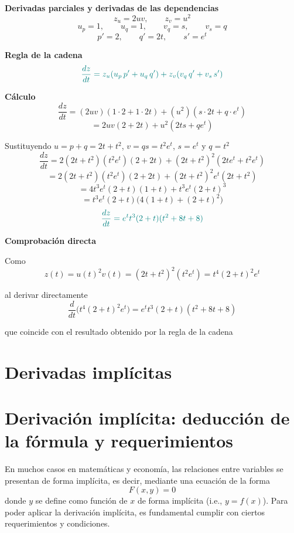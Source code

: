 \documentclass{article}
\begin{document}
\textbf{Derivadas parciales y derivadas de las dependencias}
\[
z_u=2uv,\qquad z_v=u^{2}
\]
\[
u_p=1,\qquad u_q=1,\qquad v_q=s,\qquad v_s=q
\]
\[
p'=2,\qquad q'=2t,\qquad s'=e^{t}
\]

\textbf{Regla de la cadena}
\[
\color{teal}
\frac{dz}{dt}
=
z_u\!\left(u_p\,p'+u_q\,q'\right)
+
z_v\!\left(v_q\,q'+v_s\,s'\right)
\]

\textbf{Cálculo}
\[
\frac{dz}{dt}
=
(2uv)(1\cdot 2+1\cdot 2t)
+
(u^{2})(s\cdot 2t+q\cdot e^{t})
\]
\[
=
2uv(2+2t)+u^{2}(2ts+qe^{t})
\]

Sustituyendo \(u=p+q=2t+t^{2}\), \(v=qs=t^{2}e^{t}\), \(s=e^{t}\) y \(q=t^{2}\)
\[
\frac{dz}{dt}
=
2(2t+t^{2})(t^{2}e^{t})(2+2t)
+
(2t+t^{2})^{2}(2te^{t}+t^{2}e^{t})
\]
\[
=
2(2t+t^{2})(t^{2}e^{t})(2+2t)
+
(2t+t^{2})^{2}e^{t}(2t+t^{2})
\]
\[
=
4t^{3}e^{t}(2+t)(1+t)
+
t^{3}e^{t}(2+t)^{3}
\]
\[
=
t^{3}e^{t}(2+t)\bigl(4(1+t)+(2+t)^{2}\bigr)
\]
\[
\color{teal}
\frac{dz}{dt}
=
e^{t}t^{3}(2+t)(t^{2}+8t+8)
\]

\textbf{Comprobación directa}

Como
\[
z(t)=u(t)^{2}v(t)=(2t+t^{2})^{2}(t^{2}e^{t})=t^{4}(2+t)^{2}e^{t}
\]

al derivar directamente
\[
\frac{d}{dt}\Big(t^{4}(2+t)^{2}e^{t}\Big)
=
e^{t}t^{3}(2+t)(t^{2}+8t+8)
\]

que coincide con el resultado obtenido por la regla de la cadena



\newpage

\section{Derivadas implícitas}


\section*{Derivación implícita: deducción de la fórmula y requerimientos}

En muchos casos en matemáticas y economía, las relaciones entre variables se presentan de forma implícita, es decir, mediante una ecuación de la forma
\[
F(x,y) = 0
\]
donde \( y \) se define como función de \( x \) de forma implícita (i.e., \( y = f(x) \)). Para poder aplicar la derivación implícita, es fundamental cumplir con ciertos requerimientos y condiciones.
\end{document}

